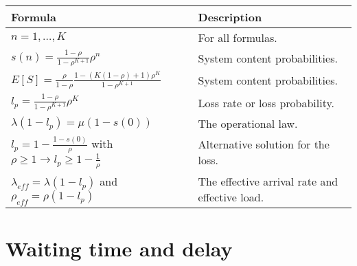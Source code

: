 \documentclass{article}
\begin{document}
\begin{longtable}{| p{9cm} | p{6cm} |}
    \hline
    \textbf{Formula} & \textbf{Description}  \\ \hline
    \endhead
    \hline
    \endfoot
    $ n = 1, \ldots, K $ & For all formulas. \\
    \hline
    $ s(n) = \frac{1 - \rho}{1 - \rho^{K+1}} \rho^n $ & System content probabilities. \\
    \hline
    $ E[S] = \frac{\rho}{1 - \rho} \frac{1 - (K(1-\rho) + 1)\rho^K}{1 - \rho^{K+1}} $ & System content probabilities. \\
    \hline
    $ l_p = \frac{1 - \rho}{1 - \rho^{K+1}} \rho^K $ & Loss rate or loss probability. \\
    \hline
    $ \lambda(1 - l_p) = \mu(1 - s(0)) $ & The operational law. \\
    \hline
    $ l_p = 1 - \frac{1 - s(0)}{\rho} $ with $ \rho \ge 1 \rightarrow l_p \ge 1 - \frac{1}{\rho} $ & Alternative solution for the loss. \\
    \hline
    $ \lambda_{eff} = \lambda(1 - l_p) $ and $ \rho_{eff} = \rho (1 - l_p) $ & The effective arrival rate and effective load. \\
    \hline
\end{longtable}

\section{Waiting time and delay}
\end{document}
